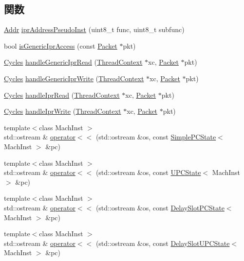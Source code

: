 \subsection*{関数}
\begin{DoxyCompactItemize}
\item 
\hyperlink{base_2types_8hh_af1bb03d6a4ee096394a6749f0a169232}{Addr} \hyperlink{namespaceGenericISA_a79a8335aadefb64d22e7fc06ac063ad0}{iprAddressPseudoInst} (uint8\_\-t func, uint8\_\-t subfunc)
\item 
bool \hyperlink{namespaceGenericISA_a5570d3282731abc7bd1318962834300e}{isGenericIprAccess} (const \hyperlink{classPacket}{Packet} $\ast$pkt)
\item 
\hyperlink{classCycles}{Cycles} \hyperlink{namespaceGenericISA_ac1de480955fd7b1b8b658e4faaece886}{handleGenericIprRead} (\hyperlink{classThreadContext}{ThreadContext} $\ast$xc, \hyperlink{classPacket}{Packet} $\ast$pkt)
\item 
\hyperlink{classCycles}{Cycles} \hyperlink{namespaceGenericISA_a1412c2f2794674f9be65d92b5b0f0b18}{handleGenericIprWrite} (\hyperlink{classThreadContext}{ThreadContext} $\ast$xc, \hyperlink{classPacket}{Packet} $\ast$pkt)
\item 
\hyperlink{classCycles}{Cycles} \hyperlink{namespaceGenericISA_a0b95fcdc1e1fe57dbb4fcad449a6efd8}{handleIprRead} (\hyperlink{classThreadContext}{ThreadContext} $\ast$xc, \hyperlink{classPacket}{Packet} $\ast$pkt)
\item 
\hyperlink{classCycles}{Cycles} \hyperlink{namespaceGenericISA_a31c83a2af3232333d9a399a2878dc729}{handleIprWrite} (\hyperlink{classThreadContext}{ThreadContext} $\ast$xc, \hyperlink{classPacket}{Packet} $\ast$pkt)
\item 
{\footnotesize template$<$class MachInst $>$ }\\std::ostream \& \hyperlink{namespaceGenericISA_a960fce0270870fc775ac34cc401036ba}{operator$<$$<$} (std::ostream \&os, const \hyperlink{classGenericISA_1_1SimplePCState}{SimplePCState}$<$ MachInst $>$ \&pc)
\item 
{\footnotesize template$<$class MachInst $>$ }\\std::ostream \& \hyperlink{namespaceGenericISA_ad7647a2fd4c0b3a52c3039868605af36}{operator$<$$<$} (std::ostream \&os, const \hyperlink{classGenericISA_1_1UPCState}{UPCState}$<$ MachInst $>$ \&pc)
\item 
{\footnotesize template$<$class MachInst $>$ }\\std::ostream \& \hyperlink{namespaceGenericISA_a1ee53cba61e057cc025be65f71694001}{operator$<$$<$} (std::ostream \&os, const \hyperlink{classGenericISA_1_1DelaySlotPCState}{DelaySlotPCState}$<$ MachInst $>$ \&pc)
\item 
{\footnotesize template$<$class MachInst $>$ }\\std::ostream \& \hyperlink{namespaceGenericISA_a07062a2b0f755aa5b023fb796d2dceed}{operator$<$$<$} (std::ostream \&os, const \hyperlink{classGenericISA_1_1DelaySlotUPCState}{DelaySlotUPCState}$<$ MachInst $>$ \&pc)
\end{DoxyCompactItemize}
